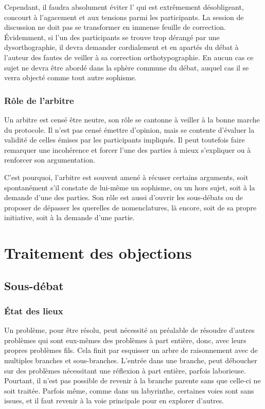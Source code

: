 Cependant, il faudra absolument éviter l’ qui est extrêmement désobligeant, concourt à l’agacement et aux tensions parmi les participants. La session de discussion ne doit pas se transformer en immense feuille de correction. Évidemment, si l’un des participants se trouve trop dérangé par une dysorthographie, il devra demander cordialement et en apartés du débat à l’auteur des fautes de veiller à sa correction orthotypographie. En aucun cas ce sujet ne devra être abordé dans la sphère commune du débat, auquel cas il se verra objecté comme tout autre sophisme.

\subsubsection{Rôle de l’arbitre}
Un arbitre est censé être neutre, son rôle se cantonne à veiller à la bonne marche du protocole. Il n’est pas censé émettre d’opinion, mais se contente d’évaluer la validité de celles émises par les participants impliqués. Il peut toutefois faire remarquer une incohérence et forcer l’une des parties à mieux s’expliquer ou à renforcer son argumentation.

C’est pourquoi, l’arbitre est souvent amené à récuser certains arguments, soit spontanément s’il constate de lui-même un sophisme, ou un hors sujet, soit à la demande d’une des parties.
 Son rôle est aussi d’ouvrir les sous-débats ou de proposer de dépasser les querelles de nomenclatures, là encore, soit de sa propre initiative, soit à la demande d’une partie.


\section{Traitement des objections}
\subsection{Sous-débat}
\subsubsection{État des lieux}
Un problème, pour être résolu, peut nécessité au préalable de résoudre d’autres problèmes qui sont eux-mêmes des problèmes à part entière, donc, avec leurs propres problèmes fils. Cela finit par esquisser un arbre de raisonnement avec de multiples branches et sous-branches. L’entrée dans une branche, peut déboucher sur des problèmes nécessitant une réflexion à part entière, parfois laborieuse. Pourtant, il n’est pas possible de revenir à la branche parente sans que celle-ci ne soit traitée. Parfois même, comme dans un labyrinthe, certaines voies sont sans issues, et il faut revenir à la voie principale pour en explorer d’autres.

